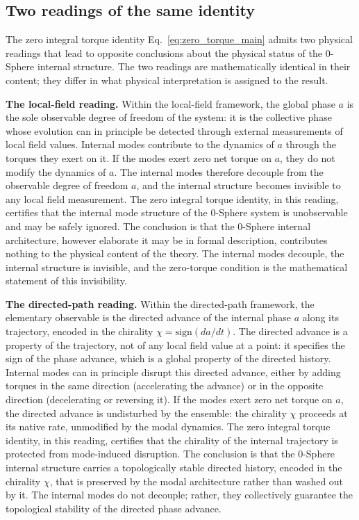 \documentclass[%
 reprint, amsmath,amssymb, aps, prb, ]{revtex4-2}
\numberwithin{equation}{section}
\begin{document}
\subsection{Two readings of the same identity}
\label{sec:two_readings}

The zero integral torque identity Eq.~\eqref{eq:zero_torque_main} admits two physical readings that lead to opposite conclusions about the physical status of the 0-Sphere internal structure. The two readings are mathematically identical in their content; they differ in what physical interpretation is assigned to the result.

\textbf{The local-field reading.} Within the local-field framework, the global phase $a$ is the sole observable degree of freedom of the system: it is the collective phase whose evolution can in principle be detected through external measurements of local field values. Internal modes contribute to the dynamics of $a$ through the torques they exert on it. If the modes exert zero net torque on $a$, they do not modify the dynamics of $a$. The internal modes therefore decouple from the observable degree of freedom $a$, and the internal structure becomes invisible to any local field measurement. The zero integral torque identity, in this reading, certifies that the internal mode structure of the 0-Sphere system is unobservable and may be safely ignored. The conclusion is that the 0-Sphere internal architecture, however elaborate it may be in formal description, contributes nothing to the physical content of the theory. The internal modes decouple, the internal structure is invisible, and the zero-torque condition is the mathematical statement of this invisibility.

\textbf{The directed-path reading.} Within the directed-path framework, the elementary observable is the directed advance of the internal phase $a$ along its trajectory, encoded in the chirality $\chi = \mathrm{sign}(da/dt)$. The directed advance is a property of the trajectory, not of any local field value at a point: it specifies the sign of the phase advance, which is a global property of the directed history. Internal modes can in principle disrupt this directed advance, either by adding torques in the same direction (accelerating the advance) or in the opposite direction (decelerating or reversing it). If the modes exert zero net torque on $a$, the directed advance is undisturbed by the ensemble: the chirality $\chi$ proceeds at its native rate, unmodified by the modal dynamics. The zero integral torque identity, in this reading, certifies that the chirality of the internal trajectory is protected from mode-induced disruption. The conclusion is that the 0-Sphere internal structure carries a topologically stable directed history, encoded in the chirality $\chi$, that is preserved by the modal architecture rather than washed out by it. The internal modes do not decouple; rather, they collectively guarantee the topological stability of the directed phase advance.
\end{document}
